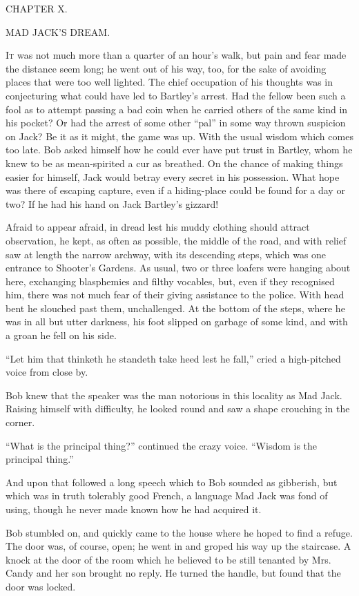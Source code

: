 {}

{CHAPTER X.}

MAD JACK'S DREAM.

\textsc{It} was not much more than a quarter of an hour's walk, but pain
and fear made the distance seem long; he went out of his way, too, for
the sake of avoiding places that were too well lighted. The chief
occupation of his thoughts was in conjecturing what could have led to
Bartley's arrest. Had the fellow been such a fool as to attempt passing
a bad coin when he carried others of the same kind in his pocket? Or had
the arrest of some other ``pal'' in some way thrown suspicion on Jack?
Be it as it might, the game was up. With the usual wisdom which comes
too late. Bob asked himself how he could ever have put trust in Bartley,
whom he knew to be as mean-spirited a cur as breathed. On the chance of
making things easier for himself, Jack would betray every secret in his
possession. What hope {}was there of escaping capture, even if a
hiding-place could be found for a day or two? If he had his hand on Jack
Bartley's gizzard!

Afraid to appear afraid, in dread lest his muddy clothing should attract
observation, he kept, as often as possible, the middle of the road, and
with relief saw at length the narrow archway, with its descending steps,
which was one entrance to Shooter's Gardens. As usual, two or three
loafers were hanging about here, exchanging blasphemies and filthy
vocables, but, even if they recognised him, there was not much fear of
their giving assistance to the police. With head bent he slouched past
them, unchallenged. At the bottom of the steps, where he was in all but
utter darkness, his foot slipped on garbage of some kind, and with a
groan he fell on his side.

``Let him that thinketh he standeth take heed lest he fall,'' cried a
high-pitched voice from close by.

Bob knew that the speaker was the man notorious in this locality as Mad
Jack. Raising himself with difficulty, he looked round and saw a shape
crouching in the corner.

``What is the principal thing?'' continued {}the crazy voice. ``Wisdom
is the principal thing.''

And upon that followed a long speech which to Bob sounded as gibberish,
but which was in truth tolerably good French, a language Mad Jack was
fond of using, though he never made known how he had acquired it.

Bob stumbled on, and quickly came to the house where he hoped to find a
refuge. The door was, of course, open; he went in and groped his way up
the staircase. A knock at the door of the room which he believed to be
still tenanted by Mrs. Candy and her son brought no reply. He turned the
handle, but found that the door was locked.

